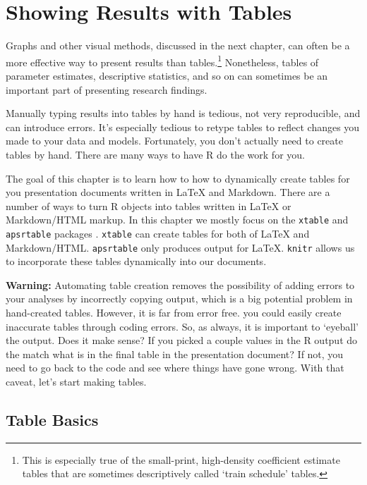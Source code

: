 



\chapter{Showing Results with Tables}\label{TablesChapter}

Graphs and other visual methods, discussed in the next chapter, can often be a more effective way to present results than tables.\footnote{This is especially true of the small-print, high-density coefficient estimate tables that are sometimes descriptively called `train schedule' tables.} Nonetheless, tables of parameter estimates, descriptive statistics, and so on can sometimes be an important part of presenting research findings.

Manually typing results into tables by hand is tedious, not very reproducible, and can introduce errors. It's especially tedious to retype tables to reflect changes you made to your data and models. Fortunately, you don't actually need to create tables by hand. There are many ways to have R do the work for you. 

The goal of this chapter is to learn how to how to dynamically create tables for you presentation documents written in LaTeX and Markdown. There are a number of ways to turn R objects into tables written in LaTeX or Markdown/HTML markup. In this chapter we mostly focus on the \texttt{xtable} \cite[]{R-xtable} and \texttt{apsrtable} packages \cite[]{R-apsrtable}. \texttt{xtable} can create tables for both of LaTeX and Markdown/HTML. \texttt{apsrtable} only
produces output for LaTeX. \texttt{knitr} allows us to incorporate these tables dynamically into our documents.

\textbf{Warning:} Automating table creation removes the possibility of adding errors to your analyses by incorrectly copying output, which is a big potential problem in hand-created tables. However, it is far from error free. you could easily create inaccurate tables through coding errors. So, as always, it is important to `eyeball' the output. Does it make sense? If you picked a couple values in the R output do the match what is in the final table in the presentation document? If not, you need to go back to the code and see where things have gone wrong. With that caveat, let's start making tables.

\section{Table Basics}

